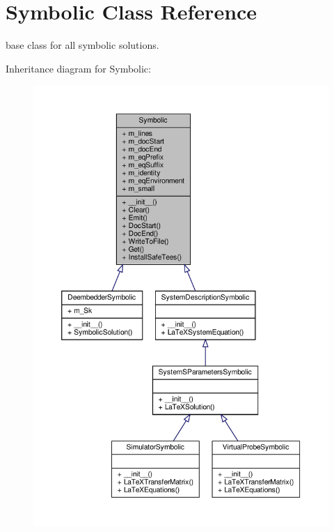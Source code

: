 \hypertarget{classSignalIntegrity_1_1SystemDescriptions_1_1Symbolic_1_1Symbolic}{}\section{Symbolic Class Reference}
\label{classSignalIntegrity_1_1SystemDescriptions_1_1Symbolic_1_1Symbolic}


base class for all symbolic solutions.  




Inheritance diagram for Symbolic\+:
\nopagebreak
\begin{figure}[H]
\begin{center}
\leavevmode
\includegraphics[width=350pt]{classSignalIntegrity_1_1SystemDescriptions_1_1Symbolic_1_1Symbolic__inherit__graph}
\end{center}
\end{figure}


